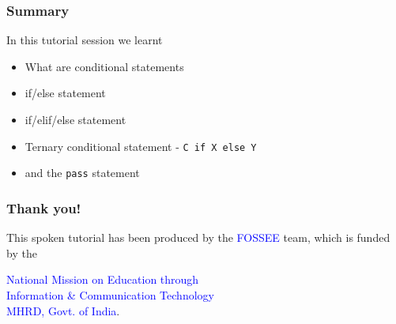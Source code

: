 \documentclass[presentation]{beamer}
\begin{document}
\begin{frame}
\frametitle{Summary}
\label{sec-7}

  In this tutorial session we learnt

\begin{itemize}
\item What are conditional statements
\item if/else statement
\item if/elif/else statement
\item Ternary conditional statement - \texttt{C if X else Y}
\item and the \texttt{pass} statement
\end{itemize}
\end{frame}
\begin{frame}
\frametitle{Thank you!}
\label{sec-8}

  \begin{block}{}
  \begin{center}
  This spoken tutorial has been produced by the
  \textcolor{blue}{FOSSEE} team, which is funded by the 
  \end{center}
  \begin{center}
    \textcolor{blue}{National Mission on Education through \\
      Information \& Communication Technology \\ 
      MHRD, Govt. of India}.
  \end{center}  
  \end{block}
\end{frame}
\end{document}

